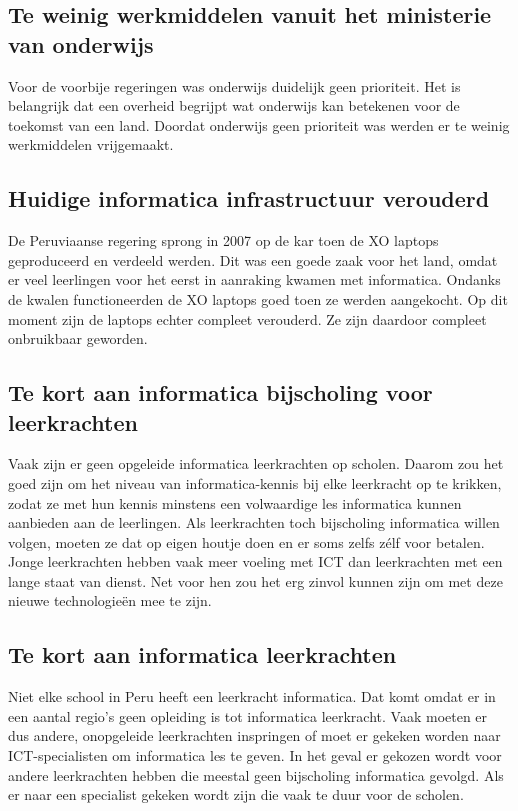 \subsection{Te weinig werkmiddelen vanuit het ministerie van onderwijs}
Voor de voorbije regeringen was onderwijs duidelijk geen prioriteit. Het is belangrijk dat een overheid begrijpt wat onderwijs kan betekenen voor de toekomst van een land. Doordat onderwijs geen prioriteit was werden er te weinig werkmiddelen vrijgemaakt.

\subsection{Huidige informatica infrastructuur verouderd}
De Peruviaanse regering sprong in 2007 op de kar toen de XO laptops geproduceerd en verdeeld werden. Dit was een goede zaak voor het land, omdat er veel leerlingen voor het eerst in aanraking kwamen met informatica. Ondanks de kwalen functioneerden de XO laptops goed toen ze werden aangekocht. Op dit moment zijn de laptops echter compleet verouderd. Ze zijn daardoor compleet onbruikbaar geworden.

\subsection{Te kort aan informatica bijscholing voor leerkrachten}
Vaak zijn er geen opgeleide informatica leerkrachten op scholen. Daarom zou het goed zijn om het niveau van informatica-kennis bij elke leerkracht op te krikken, zodat ze met hun kennis minstens een volwaardige les informatica kunnen 	aanbieden aan de leerlingen. Als leerkrachten toch bijscholing informatica willen volgen, moeten ze dat op eigen houtje doen en er soms zelfs zélf voor betalen. Jonge leerkrachten hebben vaak meer voeling met ICT dan leerkrachten met een lange staat van dienst. Net voor hen zou het erg zinvol kunnen zijn om met deze nieuwe technologieën mee te zijn. 

\subsection{Te kort aan informatica leerkrachten}
Niet elke school in Peru heeft een leerkracht informatica. Dat komt omdat er in een aantal regio's geen opleiding is tot informatica leerkracht. Vaak moeten er dus andere, onopgeleide leerkrachten inspringen of moet er gekeken worden naar ICT-specialisten om informatica les te geven. In het geval er gekozen wordt voor andere leerkrachten hebben die meestal geen bijscholing informatica gevolgd. Als er naar een specialist gekeken wordt zijn die vaak te duur voor de scholen. 


